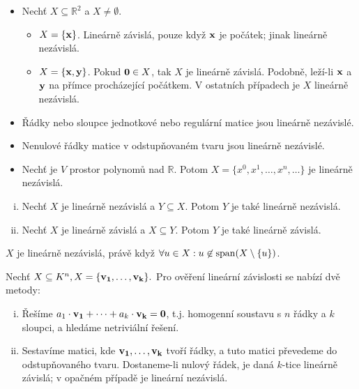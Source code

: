 \begin{remark}
    \leavevmode
    \begin{itemize}
        \item Nechť $X \subseteq \mathbb{R}^2$ a $X \neq \emptyset$.
            \begin{itemize}
                \item $X = \{\mathbf{x}\}$. Lineárně závislá, pouze když $\mathbf{x}$ je 
                    počátek; jinak lineárně nezávislá.
                \item $X = \{\mathbf{x}, \mathbf{y}\}$. Pokud $\mathbf{0} \in X$, tak $X$ je 
                    lineárně závislá. Podobně, leží-li $\mathbf{x}$ a $\mathbf{y}$ na 
                    přímce procházející počátkem. V ostatních případech 
                    je $X$ lineárně nezávislá.
            \end{itemize}
        \item Řádky nebo sloupce jednotkové nebo regulární matice jsou 
            lineárně nezávislé.
        \item Nenulové řádky matice v odstupňovaném tvaru jsou lineárně
            nezávislé.
        \item Nechť je $V$ prostor polynomů nad $\mathbb{R}$. Potom
            $X = \{x^0, x^1, \dots, x^n, \dots \}$ je lineárně nezávislá.
    \end{itemize}
\end{remark}

\begin{observation}
    \leavevmode
    \begin{enumerate}[i.]
        \item Nechť $X$ je lineárně nezávislá a $Y \subseteq X$. 
            Potom $Y$ je také lineárně nezávislá.
        \item Nechť $X$ je lineárně závislá a $X \subseteq Y$. Potom $Y$ 
            je také lineárně závislá.
    \end{enumerate}
\end{observation}

\begin{observation}
    $X$ je lineárně nezávislá, právě když $\forall u \in X: u \not \in 
    \mathop{\mathrm{span}}(X \setminus \{u\})$.
\end{observation}

\begin{remark}
    Nechť $X \subseteq K^n, X = \{\mathbf{v_1}, \dots, \mathbf{v_k} \}.$ Pro ověření
    lineární závislosti se nabízí dvě metody:
    \begin{enumerate}[i.]
        \item Řešíme $a_1\cdot\mathbf{v_1} + \dots + a_k\cdot \mathbf{v_k} = \mathbf{0}$, 
            t.j. homogenní soustavu s $n$ řádky a $k$ sloupci, a hledáme
            netriviální řešení.
        \item Sestavíme matici, kde $\mathbf{v_1}, \dots, \mathbf{v_k}$ tvoří řádky,
            a tuto matici převedeme do odstupňovaného tvaru. Dostaneme-li
            nulový řádek, je daná $k$-tice lineárně závislá; v opačném
            případě je lineární nezávislá.
    \end{enumerate}
\end{remark}

